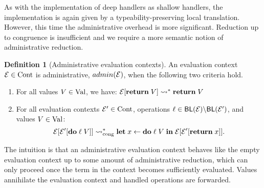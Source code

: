 \documentclass[12pt,phd,lfcs,twoside,openright,logo,leftchapter,normalheadings]{infthesis}
\theoremstyle{plain}
\theoremstyle{definition}
\newtheorem{definition}[theorem]{Definition}
\begin{document}
As with the implementation of deep handlers as shallow handlers, the
implementation is again given by a typeability-preserving local
translation. However, this time the administrative overhead is more
significant. Reduction up to congruence is insufficient and we require
a more semantic notion of administrative reduction.

\begin{definition}[Administrative evaluation contexts]\label{def:admin-eval}
  An evaluation context $\mathcal{E} \in \textrm{Cont}$ is administrative,
  $admin(\mathcal{E})$, when the following two criteria hold.
\begin{enumerate}
\item For all values $V \in \textrm{Val}$, we have: $\mathcal{E}[\mathbf{return}\;V] \leadsto^\ast
  \mathbf{return}\;V$
\item For all evaluation contexts $\mathcal{E}' \in \textrm{Cont}$, operations
  $\ell \in \mathsf{BL}(\mathcal{E}) \backslash \mathsf{BL}(\mathcal{E}')$, and values
  $V \in \textrm{Val}$:
%
\[
  \mathcal{E}[\mathcal{E}'[\mathbf{do}\;\ell\;V]] \leadsto_{\mathrm{cong}}^\ast \mathbf{let}\; x \leftarrow \mathbf{do}\;\ell\;V \;\mathbf{in}\; \mathcal{E}[\mathcal{E}'[\mathbf{return}\;x]].
\]
\end{enumerate}
\end{definition}
%
The intuition is that an administrative evaluation context behaves
like the empty evaluation context up to some amount of administrative
reduction, which can only proceed once the term in the context becomes
sufficiently evaluated.
%
Values annihilate the evaluation context and handled operations are
forwarded.
%
\end{document}

